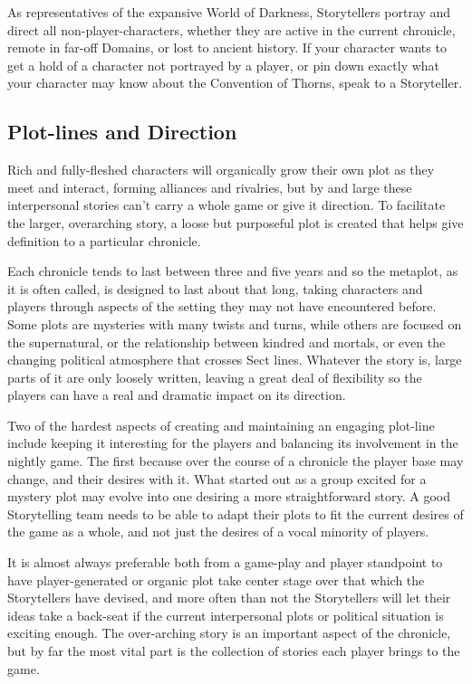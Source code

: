 As representatives of the expansive World of Darkness, Storytellers portray and 
direct all non-player-characters, whether they are active in the current chronicle, 
remote in far-off Domains, or lost to ancient history.  If your character wants to 
get a hold of a character not portrayed by a player, or pin down exactly what your 
character may know about the Convention of Thorns, speak to a Storyteller.

\subsection{Plot-lines and Direction}
Rich and fully-fleshed characters will organically grow their own plot as they meet 
and interact, forming alliances and rivalries, but by and large these interpersonal 
stories can't carry a whole game or give it direction.  To facilitate the larger, 
overarching story, a loose but purposeful plot is created that helps give definition 
to a particular chronicle.

Each chronicle tends to last between three and five years and so the metaplot, as it 
is often called, is designed to last about that long, taking characters and players 
through aspects of the setting they may not have encountered before.  Some plots are 
mysteries with many twists and turns, while others are focused on the supernatural, 
or the relationship between kindred and mortals, or even the changing political 
atmosphere that crosses Sect lines.  Whatever the story is, large parts of it are only 
loosely written, leaving a great deal of flexibility so the players can have a real and 
dramatic impact on its direction.

Two of the hardest aspects of creating and maintaining an engaging plot-line include 
keeping it interesting for the players and balancing its involvement in the nightly 
game.  The first because over the course of a chronicle the player base may change, 
and their desires with it.  What started out as a group excited for a mystery plot may evolve 
into one desiring a more straightforward story.  A good Storytelling team needs to be 
able to adapt their plots to fit the current desires of the game as a whole, and not 
just the desires of a vocal minority of players.

It is almost always preferable both from a game-play and player standpoint to have 
player-generated or organic plot take center stage over that which the Storytellers 
have devised, and more often than not the Storytellers will let their ideas take a back-seat 
if the current interpersonal plots or political situation is exciting enough.  The 
over-arching story is an important aspect of the chronicle, but by far the most vital 
part is the collection of stories each player brings to the game.

